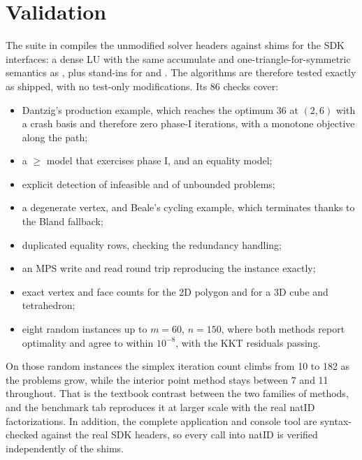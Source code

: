 \documentclass[12pt, a4paper]{article}
\begin{document}
\section{Validation}
The suite in  compiles the unmodified solver headers against shims for the SDK interfaces: a dense LU with the same accumulate and one-triangle-for-symmetric semantics as , plus stand-ins for  and . The algorithms are therefore tested exactly as shipped, with no test-only modifications. Its 86 checks cover:

\begin{itemize}
    \item Dantzig's production example, which reaches the optimum $36$ at $(2,6)$ with a crash basis and therefore zero phase-I iterations, with a monotone objective along the path;
    \item a $\ge$ model that exercises phase I, and an equality model;
    \item explicit detection of infeasible and of unbounded problems;
    \item a degenerate vertex, and Beale's cycling example, which terminates thanks to the Bland fallback;
    \item duplicated equality rows, checking the redundancy handling;
    \item an MPS write and read round trip reproducing the instance exactly;
    \item exact vertex and face counts for the 2D polygon and for a 3D cube and tetrahedron;
    \item eight random instances up to $m = 60$, $n = 150$, where both methods report optimality and agree to within $10^{-8}$, with the KKT residuals passing.
\end{itemize}

On those random instances the simplex iteration count climbs from 10 to 182 as the problems grow, while the interior point method stays between 7 and 11 throughout. That is the textbook contrast between the two families of methods, and the benchmark tab reproduces it at larger scale with the real natID factorizations. In addition, the complete application and console tool are syntax-checked against the real SDK headers, so every call into natID is verified independently of the shims.
\end{document}
